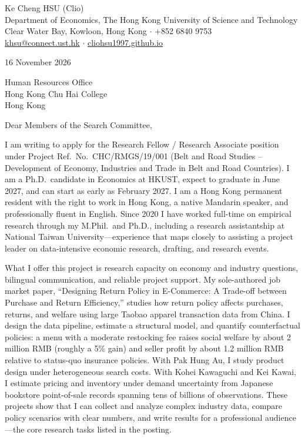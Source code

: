\documentclass[11pt]{article}
\begin{document}
\begin{flushleft}
Ke Cheng HSU (Clio) \\
Department of Economics, The Hong Kong University of Science and Technology \\
Clear Water Bay, Kowloon, Hong Kong $\cdot$ +852 6840 9753 \\
\href{mailto:khsu@connect.ust.hk}{khsu@connect.ust.hk} $\cdot$ \href{https://cliohsu1997.github.io/}{cliohsu1997.github.io}
\end{flushleft}

16 November 2026

\vspace{0.08em}
Human Resources Office \\
Hong Kong Chu Hai College \\
Hong Kong

\vspace{0.08em}
Dear Members of the Search Committee,

I am writing to apply for the Research Fellow / Research Associate position under Project Ref.\ No.\ CHC/RMGS/19/001 (Belt and Road Studies -- Development of Economy, Industries and Trade in Belt and Road Countries). I am a Ph.D.\ candidate in Economics at HKUST, expect to graduate in June 2027, and can start as early as February 2027. I am a Hong Kong permanent resident with the right to work in Hong Kong, a native Mandarin speaker, and professionally fluent in English. Since 2020 I have worked full-time on empirical research through my M.Phil.\ and Ph.D., including a research assistantship at National Taiwan University---experience that maps closely to assisting a project leader on data-intensive economic research, drafting, and research events.

What I offer this project is research capacity on economy and industry questions, bilingual communication, and reliable project support. My sole-authored job market paper, ``Designing Return Policy in E-Commerce: A Trade-off between Purchase and Return Efficiency,'' studies how return policy affects purchases, returns, and welfare using large Taobao apparel transaction data from China. I design the data pipeline, estimate a structural model, and quantify counterfactual policies: a menu with a moderate restocking fee raises social welfare by about 2 million RMB (roughly a 5\% gain) and seller profit by about 1.2 million RMB relative to status-quo insurance policies. With Pak Hung Au, I study product design under heterogeneous search costs. With Kohei Kawaguchi and Kei Kawai, I estimate pricing and inventory under demand uncertainty from Japanese bookstore point-of-sale records spanning tens of billions of observations. These projects show that I can collect and analyze complex industry data, compare policy scenarios with clear numbers, and write results for a professional audience---the core research tasks listed in the posting.
\end{document}
